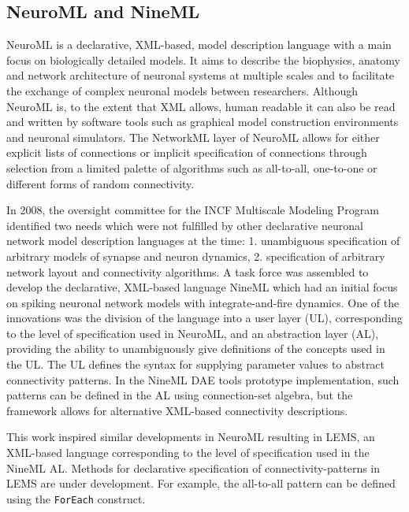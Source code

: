 \documentclass{frontiersSCNS} %
\begin{document}
\subsection{NeuroML and NineML}
NeuroML \citep{gleeson10,goddard01} is a declarative, XML-based, model
description language with a main focus on biologically detailed
models. It aims to describe the biophysics, anatomy and network
architecture of neuronal systems at multiple scales and to facilitate
the exchange of complex neuronal models between researchers. Although
NeuroML is, to the extent that XML allows, human readable it can also
be read and written by software tools such as
graphical model construction environments \citep{gleeson07} and
neuronal simulators. The NetworkML layer of NeuroML allows for either
explicit lists of connections or implicit specification of connections
through selection from a limited palette of algorithms such as
all-to-all, one-to-one or different forms of random connectivity.

In 2008, the oversight committee for the INCF Multiscale Modeling
Program identified two needs which were not fulfilled by other
declarative neuronal network model description languages at the time:
1. unambiguous specification of arbitrary models of synapse and neuron
dynamics, 2. specification of arbitrary network layout and
connectivity algorithms.  A task force was assembled to develop the
declarative, XML-based language NineML \citep{raikov11} which had an
initial focus on spiking neuronal network models with
integrate-and-fire dynamics.  One of the innovations was the division
of the language into a user layer (UL), corresponding to the level of
specification used in NeuroML, and an abstraction layer (AL),
providing the ability to unambiguously give definitions of the
concepts used in the UL. The UL defines the syntax for supplying
parameter values to abstract connectivity patterns. In the NineML DAE
tools \citep{nikolic10} prototype implementation, such patterns can be
defined in the AL using connection-set algebra, but the framework
allows for alternative XML-based connectivity descriptions.

This work inspired similar developments in NeuroML resulting in LEMS,
an XML-based language corresponding to the level of specification used
in the NineML AL.  Methods for declarative specification of
connectivity-patterns in LEMS are under development.  For example, the
all-to-all pattern can be defined using the \verb|ForEach| construct.
\end{document}
